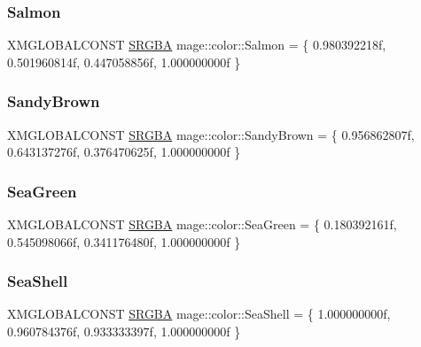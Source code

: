 \hypertarget{namespacemage_1_1color_ac05f0e6236580b710313e3d965ba8921}{}\label{namespacemage_1_1color_ac05f0e6236580b710313e3d965ba8921} 
\subsubsection{\texorpdfstring{Salmon}{Salmon}}
{\footnotesize\ttfamily X\+M\+G\+L\+O\+B\+A\+L\+C\+O\+N\+ST \hyperlink{structmage_1_1_s_r_g_b_a}{S\+R\+G\+BA} mage\+::color\+::\+Salmon = \{ 0.\+980392218f, 0.\+501960814f, 0.\+447058856f, 1.\+000000000f \}}

\hypertarget{namespacemage_1_1color_af4d1507b2bcd178ac7195ae4e053075c}{}\label{namespacemage_1_1color_af4d1507b2bcd178ac7195ae4e053075c} 
\subsubsection{\texorpdfstring{Sandy\+Brown}{SandyBrown}}
{\footnotesize\ttfamily X\+M\+G\+L\+O\+B\+A\+L\+C\+O\+N\+ST \hyperlink{structmage_1_1_s_r_g_b_a}{S\+R\+G\+BA} mage\+::color\+::\+Sandy\+Brown = \{ 0.\+956862807f, 0.\+643137276f, 0.\+376470625f, 1.\+000000000f \}}

\hypertarget{namespacemage_1_1color_a2589b32d7aeb0866ac1e9dc06979cf54}{}\label{namespacemage_1_1color_a2589b32d7aeb0866ac1e9dc06979cf54} 
\subsubsection{\texorpdfstring{Sea\+Green}{SeaGreen}}
{\footnotesize\ttfamily X\+M\+G\+L\+O\+B\+A\+L\+C\+O\+N\+ST \hyperlink{structmage_1_1_s_r_g_b_a}{S\+R\+G\+BA} mage\+::color\+::\+Sea\+Green = \{ 0.\+180392161f, 0.\+545098066f, 0.\+341176480f, 1.\+000000000f \}}

\hypertarget{namespacemage_1_1color_aa8a0da85ed6da88876eaeb2b89582b3f}{}\label{namespacemage_1_1color_aa8a0da85ed6da88876eaeb2b89582b3f} 
\subsubsection{\texorpdfstring{Sea\+Shell}{SeaShell}}
{\footnotesize\ttfamily X\+M\+G\+L\+O\+B\+A\+L\+C\+O\+N\+ST \hyperlink{structmage_1_1_s_r_g_b_a}{S\+R\+G\+BA} mage\+::color\+::\+Sea\+Shell = \{ 1.\+000000000f, 0.\+960784376f, 0.\+933333397f, 1.\+000000000f \}}

